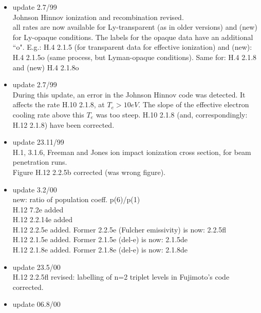 \documentclass[12pt,dvips]{article}
\begin{document}
\begin{itemize}
               (only 2.3.9b,K10, differs from earlier version)\\
               H.4 2.3.9e, 2.3.9f 2.3.9g  redone \\
               (only 2.3.9f,K20, differs from earlier version)\\
               H.4 2.3.9h, 2.3.9i 2.3.9j  redone \\
               (only 2.3.9j,K30, differs from earlier version)\\
 \item update   2.7/99 \\
  Johnson Hinnov ionization and recombination revised.\\
  all rates are now available for Ly-transparent (as in older versions)
  and (new) for Ly-opaque conditions. The labels for the opaque
  data have an additional ``o". E.g.: H.4 2.1.5 (for transparent
  data for effective ionization) and (new): H.4 2.1.5o (same process,
  but Lyman-opaque conditions). Same for: H.4 2.1.8 and (new) H.4 2.1.8o
 \item update   2.7/99 \\
  During this update, an error in the Johnson Hinnov code was detected.
  It affects the rate H.10 2.1.8, at $T_e > 10 eV$. The slope of the
  effective electron cooling rate above this $T_e$ was too steep.
  H.10 2.1.8  (and, correspondingly: H.12 2.1.8) have been corrected.
 \item update   23.11/99 \\
  H.1, 3.1.6, Freeman and Jones ion impact ionization cross section,
  for beam penetration runs.\\
  Figure H.12 2.2.5b corrected (was wrong figure).
 \item update   3.2/00 \\
  new: ratio of population coeff. p(6)/p(1)\\
  H.12 7.2e added                            \\
  H.12 2.2.14e added                          \\
  H.12 2.2.5e added. Former 2.2.5e (Fulcher emissivity) is now:
                            2.2.5fl\\
  H.12 2.1.5e added. Former 2.1.5e (del-e) is now: 2.1.5de \\
  H.12 2.1.8e added. Former 2.1.8e (del-e) is now: 2.1.8de
 \item update  23.5/00 \\
  H.12 2.2.5fl revised: labelling of n=2 triplet levels in Fujimoto's
  code corrected.
 \item update  06.8/00 \\

\end{itemize}
\end{document}
